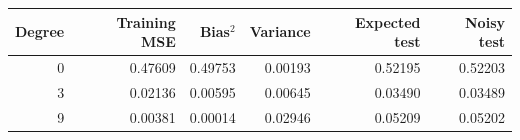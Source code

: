 \begin{center}\small
\begin{tabular}{rrrrrr}
\toprule Degree & Training MSE & Bias$^2$ & Variance & Expected test & Noisy test\\
\midrule
0 & 0.47609 & 0.49753 & 0.00193 & 0.52195 & 0.52203\\
3 & 0.02136 & 0.00595 & 0.00645 & 0.03490 & 0.03489\\
9 & 0.00381 & 0.00014 & 0.02946 & 0.05209 & 0.05202\\
\bottomrule
\end{tabular}
\end{center}
